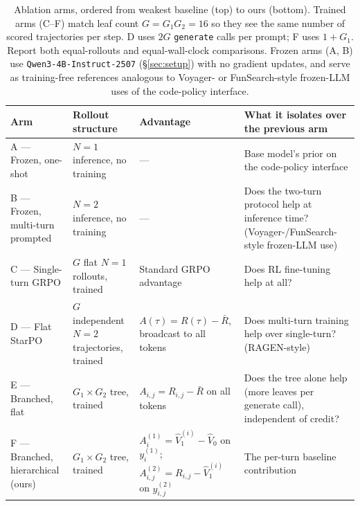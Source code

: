 \documentclass[11pt,a4paper]{article}
\begin{document}
\begin{table}[h]
\centering
\small
\begin{tabular}{@{}lp{3.2cm}p{4.3cm}p{4.0cm}@{}}
\toprule
Arm & Rollout structure & Advantage & What it isolates over the previous arm \\
\midrule
A --- Frozen, one-shot & $N{=}1$ inference, no training & --- & Base model's prior on the code-policy interface \\
B --- Frozen, multi-turn prompted & $N{=}2$ inference, no training & --- & Does the two-turn protocol help at inference time? (Voyager-/FunSearch-style frozen-LLM use) \\
C --- Single-turn GRPO & $G$ flat $N{=}1$ rollouts, trained & Standard GRPO advantage & Does RL fine-tuning help at all? \\
D --- Flat StarPO & $G$ independent $N{=}2$ trajectories, trained & $A(\tau) = R(\tau) - \bar R$, broadcast to all tokens & Does multi-turn training help over single-turn? (RAGEN-style) \\
E --- Branched, flat & $G_1{\times}G_2$ tree, trained & $A_{i,j} = R_{i,j} - \bar R$ on all tokens & Does the tree alone help (more leaves per generate call), independent of credit? \\
F --- Branched, hierarchical (ours) & $G_1{\times}G_2$ tree, trained & $A^{(1)}_i = \widehat V_1^{(i)} - \widehat V_0$ on $y^{(1)}_i$; $A^{(2)}_{i,j} = R_{i,j} - \widehat V_1^{(i)}$ on $y^{(2)}_{i,j}$ & The per-turn baseline contribution \\
\bottomrule
\end{tabular}
\caption{Ablation arms, ordered from weakest baseline (top) to ours
(bottom). Trained arms (C--F) match leaf count $G = G_1 G_2 = 16$ so
they see the same number of scored trajectories per step. D uses
$2G$ \texttt{generate} calls per prompt; F uses $1+G_1$. Report both
equal-rollouts and equal-wall-clock comparisons. Frozen arms (A, B)
use \texttt{Qwen3-4B-Instruct-2507} (\S\ref{sec:setup}) with no
gradient updates, and serve as training-free references analogous to
Voyager- or FunSearch-style frozen-LLM uses of the code-policy
interface.}
\label{tab:ablation}
\end{table}
\end{document}
